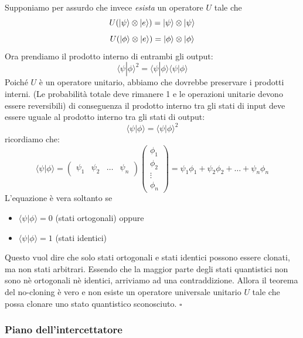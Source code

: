 \documentclass[a4paper]{article}
\begin{document}
Supponiamo per assurdo che invece \textit{esista} un operatore $U$ tale che
\[U(\ket{\psi} \otimes \ket{e}) = \ket{\psi} \otimes \ket{\psi}\]
\[U(\ket{\phi} \otimes \ket{e}) = \ket{\phi} \otimes \ket{\phi}\]
Ora prendiamo il prodotto interno di entrambi gli output:
\[
\langle \psi | \phi \rangle^2 = \langle \psi | \phi \rangle  \langle \psi | \phi \rangle
\]
Poiché $U$ è un operatore unitario, abbiamo che dovrebbe preservare i prodotti interni.
(Le probabilità totale deve rimanere 1 e le operazioni unitarie devono essere reversibili)
di conseguenza il prodotto interno tra gli stati di input deve essere uguale al prodotto interno tra gli stati di output:
\[\langle \psi | \phi \rangle = \langle \psi | \phi \rangle^2 \]
ricordiamo che:
\[\langle \psi | \phi \rangle = \begin{pmatrix}
  \psi_1 & \psi_2 & \dots & \psi_n 
\end{pmatrix} \begin{pmatrix}
  \phi_1 \\
  \phi_2 \\
  \vdots \\
  \phi_n
\end{pmatrix} = \psi_1\phi_1 + \psi_2\phi_2 + \dots + \psi_n\phi_n\]
L'equazione è vera soltanto se 
\begin{itemize}
  \item $\langle \psi | \phi \rangle = 0$ (stati ortogonali) oppure
  \item $\langle \psi | \phi \rangle = 1$ (stati identici)
\end{itemize}
Questo vuol dire che solo stati ortogonali e stati identici possono essere clonati, ma non stati arbitrari.
Essendo che la maggior parte degli stati quantistici non sono nè ortogonali nè identici, arriviamo ad una contraddizione.
Allora il teorema del no-cloning è vero e non esiste un operatore universale unitario $U$ tale che possa clonare uno stato quantistico sconosciuto. $\square$

\subsubsection{Piano dell'intercettatore}
\end{document}
